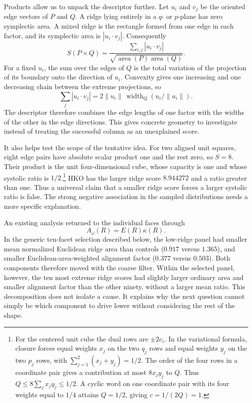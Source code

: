 Products allow us to unpack the descriptor further. Let $u_i$ and $v_j$ be
the oriented edge vectors of $P$ and $Q$. A ridge lying entirely in a $q$-
or $p$-plane has zero symplectic area. A mixed ridge is the rectangle formed
from one edge in each factor, and its symplectic area is $|u_i\cdot v_j|$.
Consequently
\[
 S(P\times Q)=\frac{\sum_{i,j}|u_i\cdot v_j|}
                    {\sqrt{\operatorname{area}(P)\operatorname{area}(Q)}}.
\]
For a fixed $u_i$, the sum over the edges of $Q$ is the total variation of
the projection of its boundary onto the direction of $u_i$. Convexity gives
one increasing and one decreasing chain between the extreme projections,
so
\[
 \sum_j|u_i\cdot v_j|
 =2\|u_i\|\,\operatorname{width}_Q(u_i/\|u_i\|).
\]
The descriptor therefore combines the edge lengths of one factor with the
widths of the other in the edge directions. This gives concrete geometry
to investigate instead of treating the successful column as an unexplained
score.

It also helps test the scope of the tentative idea. For two aligned unit
squares, eight edge pairs have absolute scalar product one and the rest
zero, so $S=8$. Their product is the unit four-dimensional cube, whose
capacity is one and whose systolic ratio is $1/2$.\footnote{For the centered
unit cube the dual rows are $\pm2e_i$. In the variational formula, closure
forces equal weights $x_j$ on the two $q_j$ rows and equal weights $y_j$ on
the two $p_j$ rows, with $\sum_{j=1}^2(x_j+y_j)=1/2$. The order of the four
rows in a coordinate pair gives a contribution at most $8x_jy_j$ to $Q$.
Thus $Q\leq8\sum_jx_jy_j\leq1/2$. A cyclic word on one coordinate pair
with its four weights equal to $1/4$ attains $Q=1/2$, giving $c=1/(2Q)=1$.} HKO has the larger ridge
score $8.944272$ and a ratio greater than one. Thus a universal claim that
a smaller ridge score forces a larger systolic ratio is false. The strong
negative association in the sampled distributions needs a more specific
explanation.

An existing analysis returned to the individual faces through
\[
 A_\omega(R)=E(R)\kappa(R).
\]
In the generic ten-facet selection described below, the low-ridge panel had
smaller mean normalized Euclidean ridge area than controls ($0.917$ versus
$1.365$), and smaller Euclidean-area-weighted alignment factor ($0.377$
versus $0.503$). Both components therefore moved with the coarse filter.
Within the selected panel, however, the ten most extreme ridge scores had
slightly larger ordinary area and smaller alignment factor than the other
ninety, without a larger mean ratio. This decomposition does not isolate a
cause. It explains why the next question cannot simply be which component
to drive lower without considering the rest of the shape.

